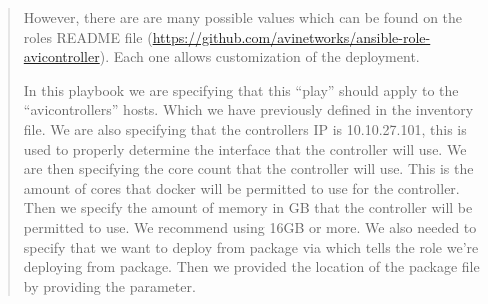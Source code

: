 \documentclass[letterpaper,10pt,english]{sphinxmanual}
\begin{document}
\begin{quote}

\begin{sphinxVerbatim}[commandchars=\\\{\}]
  
   
      
       
       
       
       
       
\end{sphinxVerbatim}

However, there are are many possible values which can be found on the roles README file (\url{https://github.com/avinetworks/ansible-role-avicontroller}). Each one allows customization of the deployment.

In this playbook we are specifying that this ``play'' should apply to the ``avicontrollers'' hosts. Which we have previously defined in the inventory file. We are also specifying that the controllers IP is 10.10.27.101, this is used to properly determine the interface that the controller will use. We are then specifying the core count that the controller will use. This is the amount of cores that docker will be permitted to use for the controller. Then we specify the amount of memory in GB that the controller will be permitted to use. We recommend using 16GB or more. We also needed to specify that we want to deploy from package via  which tells the role we're deploying from package. Then we provided the location of the package file by providing the  parameter.
\end{quote}
\end{document}
